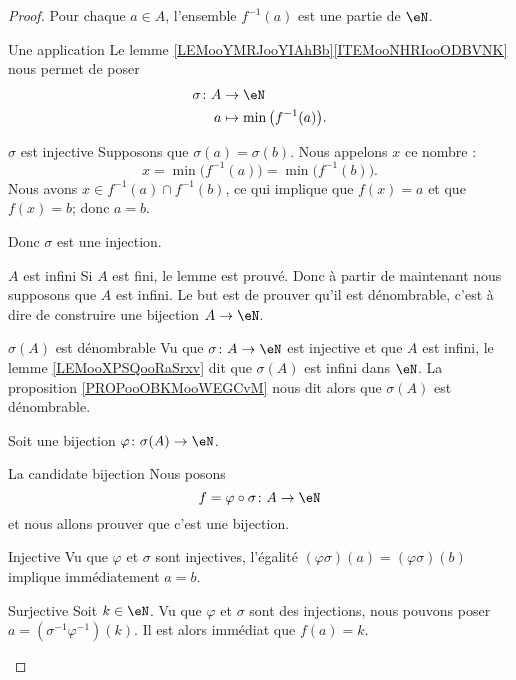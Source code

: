 \begin{proof}
    Pour chaque \( a\in A\), l'ensemble \( f^{-1}(a)\) est une partie de \( \eN\). 
    \begin{subproof}
        \item[Une application]
            Le lemme \ref{LEMooYMRJooYIAhBb}\ref{ITEMooNHRIooODBVNK} nous permet de poser
            \begin{equation}
                \begin{aligned}
                    \sigma\colon A&\to \eN \\
                    a&\mapsto \min\big( f^{-1}(a) \big). 
                \end{aligned}
            \end{equation}
        \item[\( \sigma\) est injective]
            Supposons que \( \sigma(a)=\sigma(b)\). Nous appelons \( x\) ce nombre :
            \begin{equation}
                x=\min\big( f^{-1}(a) \big)=\min\big( f^{-1}(b) \big).
            \end{equation}
            Nous avons \( x\in f^{-1}(a)\cap f^{-1}(b)\), ce qui implique que \( f(x)=a\) et que \( f(x)=b\); donc \( a=b\).

            Donc \( \sigma\) est une injection.
        \item[\( A\) est infini]
            Si \( A\) est fini, le lemme est prouvé. Donc à partir de maintenant nous supposons que \( A\) est infini. Le but est de prouver qu'il est dénombrable, c'est à dire de construire une bijection \( A\to \eN\).
        \item[\( \sigma(A)\) est dénombrable]
            Vu que \( \sigma\colon A\to  \eN\) est injective et que \( A\) est infini, le lemme \ref{LEMooXPSQooRaSrxv} dit que \( \sigma(A)\) est infini dans \( \eN\). La proposition \ref{PROPooOBKMooWEGCvM} nous dit alors que \( \sigma(A)\) est dénombrable.

            Soit une bijection \( \varphi\colon \sigma(A)\to \eN\).
        \item[La candidate bijection]
            Nous posons
            \begin{equation}
                f=\varphi\circ \sigma\colon A\to \eN
            \end{equation}
            et nous allons prouver que c'est une bijection.
        \item[Injective]
            Vu que \( \varphi\) et \( \sigma\) sont injectives, l'égalité \( (\varphi\sigma)(a)=(\varphi\sigma)(b)\) implique immédiatement \( a=b\).
        \item[Surjective]
            Soit \( k\in \eN\). Vu que \( \varphi\) et \( \sigma\) sont des injections, nous pouvons poser \( a=(\sigma^{-1}\varphi^{-1})(k)\). Il est alors immédiat que \( f(a)=k\).
    \end{subproof}
\end{proof}

